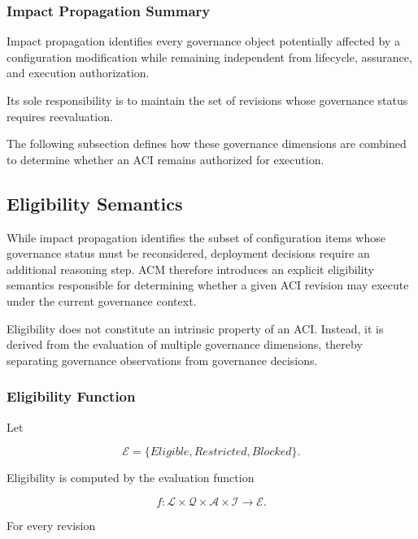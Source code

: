 \documentclass[10pt]{article}
\begin{document}
\subsubsection{Impact Propagation Summary}

Impact propagation identifies every governance object potentially affected by a
configuration modification while remaining independent from lifecycle,
assurance, and execution authorization.

Its sole responsibility is to maintain the set of revisions whose governance
status requires reevaluation.

The following subsection defines how these governance dimensions are combined
to determine whether an ACI remains authorized for execution.

\subsection{Eligibility Semantics}
\label{subsec:eligibility}

While impact propagation identifies the subset of configuration items whose
governance status must be reconsidered, deployment decisions require an
additional reasoning step. ACM therefore introduces an explicit eligibility
semantics responsible for determining whether a given ACI revision may execute
under the current governance context.

Eligibility does not constitute an intrinsic property of an ACI.
Instead, it is derived from the evaluation of multiple governance dimensions,
thereby separating governance observations from governance decisions.

\subsubsection{Eligibility Function}

Let

\[
\mathcal{E}
=
\{
Eligible,
Restricted,
Blocked
\}.
\]

Eligibility is computed by the evaluation function

\[
f
:
\mathcal{L}
\times
\mathcal{Q}
\times
\mathcal{A}
\times
\mathcal{I}
\rightarrow
\mathcal{E}.
\]

For every revision
\end{document}
